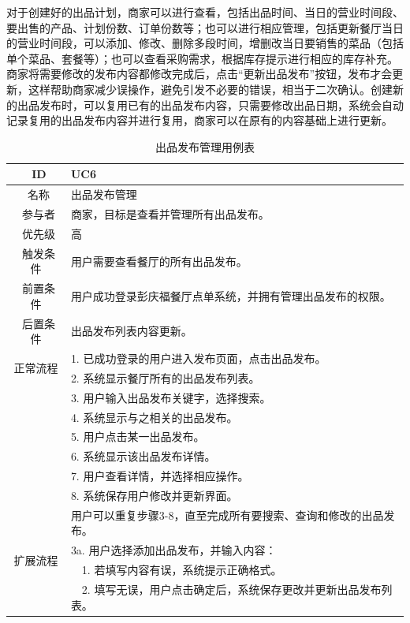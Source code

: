 对于创建好的出品计划，商家可以进行查看，包括出品时间、当日的营业时间段、要出售的产品、计划份数、订单份数等；也可以进行相应管理，包括更新餐厅当日的营业时间段，可以添加、修改、删除多段时间，增删改当日要销售的菜品（包括单个菜品、套餐等）；也可以查看采购需求，根据库存提示进行相应的库存补充。商家将需要修改的发布内容都修改完成后，点击“更新出品发布”按钮，发布才会更新，这样帮助商家减少误操作，避免引发不必要的错误，相当于二次确认。创建新的出品发布时，可以复用已有的出品发布内容，只需要修改出品日期，系统会自动记录复用的出品发布内容并进行复用，商家可以在原有的内容基础上进行更新。

\begin{table}[htbp!]
  \footnotesize
  \centering
  \caption{出品发布管理用例表}
  \vspace{2mm}
  \begin{tabular}{cp{11.5cm}}
   \hline
   \ ID & UC6 \\ 
   \hline
   \ 名称 & 出品发布管理 \\ 
   \hline
   \ 参与者 & 商家，目标是查看并管理所有出品发布。 \\ 
   \hline
   \ 优先级 & 高 \\ 
   \hline
   \ 触发条件 & 用户需要查看餐厅的所有出品发布。 \\ 
   \hline
   \ 前置条件 & 用户成功登录彭庆福餐厅点单系统，并拥有管理出品发布的权限。 \\ 
   \hline
   \ 后置条件 & 出品发布列表内容更新。 \\ 
   \hline
   \multirow{2}{*}{正常流程}
    & 1.	已成功登录的用户进入发布页面，点击出品发布。\\
    & 2.	系统显示餐厅所有的出品发布列表。\\
    & 3.	用户输入出品发布关键字，选择搜索。\\
    & 4.	系统显示与之相关的出品发布。\\
    & 5.  用户点击某一出品发布。\\
    & 6.  系统显示该出品发布详情。\\
    & 7.  用户查看详情，并选择相应操作。\\
    & 8.  系统保存用户修改并更新界面。\\
    & 用户可以重复步骤3-8，直至完成所有要搜索、查询和修改的出品发布。\\
   \hline
   \multirow{2}{*}{扩展流程}
    & 3a. 用户选择添加出品发布，并输入内容：\\
    & ~~1.	若填写内容有误，系统提示正确格式。\\
    & ~~2.	填写无误，用户点击确定后，系统保存更改并更新出品发布列表。\\

\end{tabular}
\end{table}

